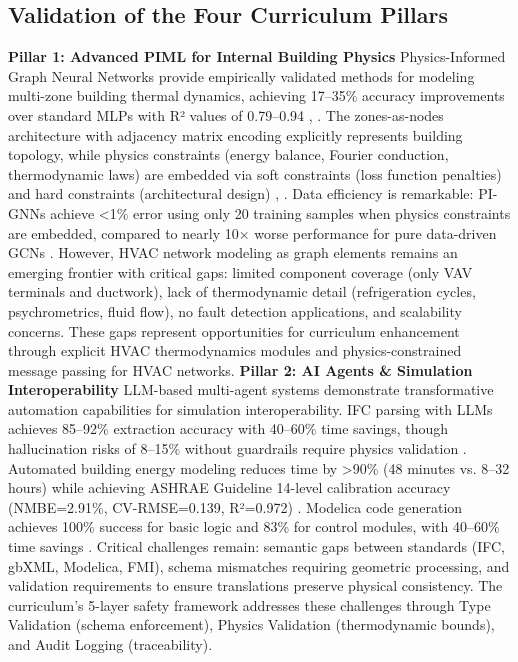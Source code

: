 \documentclass[12pt,a4paper]{article}
\begin{document}
\subsection{Validation of the Four Curriculum Pillars}
\textbf{Pillar 1: Advanced PIML for Internal Building Physics}
Physics-Informed Graph Neural Networks provide empirically validated methods for modeling multi-zone building thermal dynamics, achieving 17--35\% accuracy improvements over standard MLPs with R² values of 0.79--0.94 \cite{ref211}, \cite{ref25}. The zones-as-nodes architecture with adjacency matrix encoding explicitly represents building topology, while physics constraints (energy balance, Fourier conduction, thermodynamic laws) are embedded via soft constraints (loss function penalties) and hard constraints (architectural design) \cite{ref179}, \cite{ref26}. Data efficiency is remarkable: PI-GNNs achieve <1\% error using only 20 training samples when physics constraints are embedded, compared to nearly 10× worse performance for pure data-driven GCNs \cite{ref162}.
However, HVAC network modeling as graph elements remains an emerging frontier with critical gaps: limited component coverage (only VAV terminals and ductwork), lack of thermodynamic detail (refrigeration cycles, psychrometrics, fluid flow), no fault detection applications, and scalability concerns. These gaps represent opportunities for curriculum enhancement through explicit HVAC thermodynamics modules and physics-constrained message passing for HVAC networks.
\textbf{Pillar 2: AI Agents \& Simulation Interoperability}
LLM-based multi-agent systems demonstrate transformative automation capabilities for simulation interoperability. IFC parsing with LLMs achieves 85--92\% extraction accuracy with 40--60\% time savings, though hallucination risks of 8--15\% without guardrails require physics validation \cite{ref21}. Automated building energy modeling reduces time by >90\% (48 minutes vs. 8--32 hours) while achieving ASHRAE Guideline 14-level calibration accuracy (NMBE=2.91\%, CV-RMSE=0.139, R²=0.972) \cite{ref36}. Modelica code generation achieves 100\% success for basic logic and 83\% for control modules, with 40--60\% time savings \cite{ref61}.
Critical challenges remain: semantic gaps between standards (IFC, gbXML, Modelica, FMI), schema mismatches requiring geometric processing, and validation requirements to ensure translations preserve physical consistency. The curriculum's 5-layer safety framework addresses these challenges through Type Validation (schema enforcement), Physics Validation (thermodynamic bounds), and Audit Logging (traceability).
\end{document}
